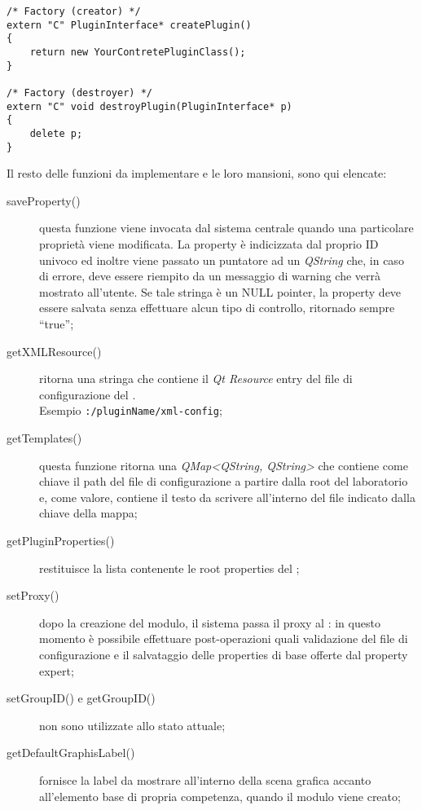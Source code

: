 \begin{lstlisting}
/* Factory (creator) */
extern "C" PluginInterface* createPlugin()
{
	return new YourContretePluginClass();
}

/* Factory (destroyer) */
extern "C" void destroyPlugin(PluginInterface* p)
{
	delete p;
}
\end{lstlisting}
Il resto delle funzioni da implementare e le loro mansioni, sono qui elencate:
\begin{description}
\item[saveProperty()] questa funzione viene invocata dal sistema centrale quando una particolare proprietà viene modificata. La property è indicizzata dal proprio ID univoco ed inoltre viene passato un puntatore ad un \emph{QString} che, in caso di errore, deve essere riempito da un messaggio di warning che verrà mostrato all'utente. Se tale stringa è un NULL pointer, la property deve essere salvata senza effettuare alcun tipo di controllo, ritornado sempre ``true'';

\item[getXMLResource()] ritorna una stringa che contiene il \emph{Qt Resource} entry del file di configurazione del \plugin{}. \\
Esempio \texttt{:/pluginName/xml-config};

\item[getTemplates()] questa funzione ritorna una \emph{QMap<QString, QString>} che contiene come chiave il path del file di configurazione a partire dalla root del laboratorio e, come valore, contiene il testo da scrivere all'interno del file indicato dalla chiave della mappa;

\item[getPluginProperties()] restituisce la lista contenente le root properties del \plugin{};

\item[setProxy()] dopo la creazione del modulo, il sistema passa il proxy al \plugin{}: in questo momento è possibile effettuare post-operazioni quali validazione del file \xml{} di configurazione e il salvataggio delle properties di base offerte dal property expert; 

\item[setGroupID() e getGroupID()] non sono utilizzate allo stato attuale;

\item[getDefaultGraphisLabel()] fornisce la label da mostrare all'interno della scena grafica accanto all'elemento base di propria competenza, quando il modulo viene creato;


\end{description}
